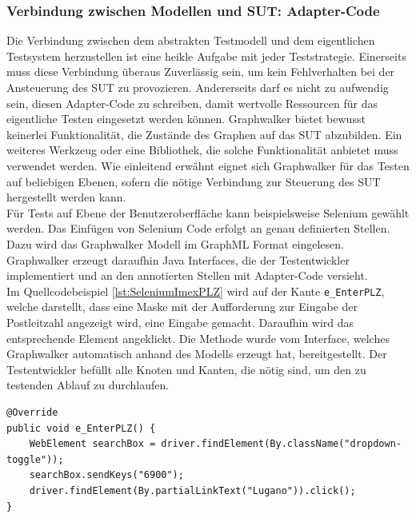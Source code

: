 \subsubsection{Verbindung zwischen Modellen und \Gls{SUT}: Adapter-Code}
Die Verbindung zwischen dem abstrakten Testmodell und dem eigentlichen Testsystem herzustellen ist eine heikle Aufgabe mit jeder Teststrategie. Einerseits muss diese Verbindung überaus Zuverlässig sein, um kein Fehlverhalten bei der Ansteuerung des \Gls{SUT} zu provozieren. Andererseits darf es nicht zu aufwendig sein, diesen Adapter-Code zu schreiben, damit wertvolle Ressourcen für das eigentliche Testen eingesetzt werden können. Graphwalker bietet bewusst keinerlei Funktionalität, die Zustände des Graphen auf das \Gls{SUT} abzubilden. Ein weiteres Werkzeug oder eine Bibliothek, die solche Funktionalität anbietet muss verwendet werden. Wie einleitend erwähnt eignet sich Graphwalker für das Testen auf beliebigen Ebenen, sofern die nötige Verbindung zur Steuerung des \Gls{SUT} hergestellt werden kann.\\
Für Tests auf Ebene der Benutzeroberfläche kann beispielsweise Selenium gewählt werden. Das Einfügen von Selenium Code erfolgt an genau definierten Stellen. Dazu wird das Graphwalker Modell im GraphML Format eingelesen. Graphwalker erzeugt daraufhin Java Interfaces, die der Testentwickler implementiert und an den annotierten Stellen mit Adapter-Code versieht.\\
Im Quellcodebeispiel \ref{lst:SeleniumImexPLZ} wird auf der Kante \texttt{e\_EnterPLZ}, welche darstellt, dass eine Maske mit der Aufforderung zur Eingabe der Postleitzahl angezeigt wird, eine Eingabe gemacht. Daraufhin wird das entsprechende Element angeklickt. Die Methode wurde vom Interface, welches Graphwalker automatisch anhand des Modells erzeugt hat, bereitgestellt. Der Testentwickler befüllt alle Knoten und Kanten, die nötig sind, um den zu testenden Ablauf zu durchlaufen. 

\begin{lstlisting}[caption={Auf einer Kante wird mittels Selenium eine Eingabe und ein Klick durchgeführt.}, label=lst:SeleniumImexPLZ, float]
@Override
public void e_EnterPLZ() {
    WebElement searchBox = driver.findElement(By.className("dropdown-toggle"));
    searchBox.sendKeys("6900");
    driver.findElement(By.partialLinkText("Lugano")).click();
}
\end{lstlisting}

